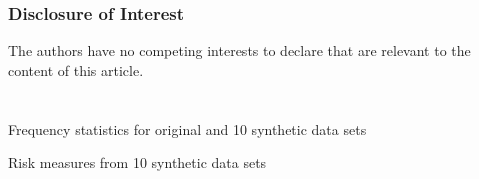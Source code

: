 \documentclass[a4paper,11pt]{style/uneceart}
\begin{document}
\subsubsection{Disclosure of Interest} The authors have no competing interests to declare that are relevant to the content of this article.






\clearpage
\appendix

\section{}\label{appendix}
\setcounter{figure}{0}    
\setcounter{table}{0}    
\renewcommand*\thetable{\Alph{section}.\arabic{table}}
\renewcommand*\thefigure{\Alph{section}.\arabic{figure}}
\renewcommand{\theHfigure}{\Alph{section}.\arabic{table}}
\renewcommand{\theHtable}{\Alph{section}.\arabic{figure}}

\begin{table}[!ht]
    \centering
    \caption{Frequency statistics for original and 10 synthetic data sets}
    
    \label{table:frequency_10_data_sets}
\end{table}

\begin{table}[!ht]
    \centering
    \caption{Risk measures from 10 synthetic data sets}
    
    \label{table:disclosure_risk_10}
\end{table}
\end{document}

